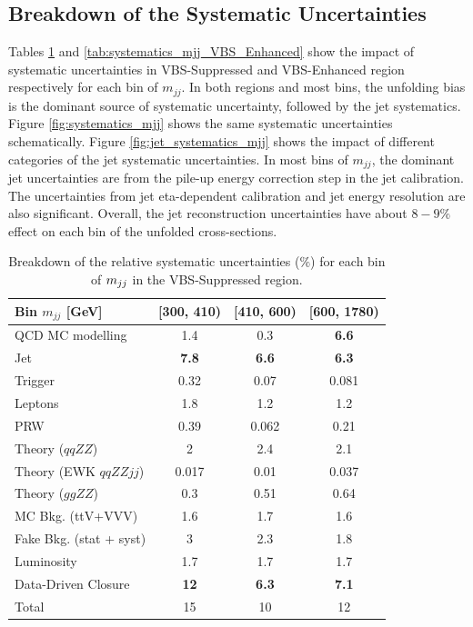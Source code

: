 \subsection{Breakdown of the Systematic Uncertainties }
\label{subsec:SysUncBreakdown}
Tables \ref{tab:systematics_mjj_VBS_Suppressed} and \ref{tab:systematics_mjj_VBS_Enhanced} show the impact of systematic uncertainties in VBS-Suppressed and VBS-Enhanced region respectively for each bin of $m_{jj}$. In both regions and most bins, the unfolding bias is the dominant source of systematic uncertainty, followed by the jet systematics. Figure \ref{fig:systematics_mjj} shows the same systematic uncertainties schematically. Figure \ref{fig:jet_systematics_mjj} shows the impact of different categories of the jet systematic uncertainties. In most bins of $m_{jj}$, the dominant jet uncertainties are from the pile-up energy correction step in the jet calibration. The uncertainties from jet eta-dependent calibration and jet energy resolution are also significant. Overall, the jet reconstruction uncertainties have about $8-9\%$ effect on each bin of the unfolded cross-sections.

\begin{table}
\centering
\begin{tabular}{|l || c | c | c | }
\hline 
Bin $m_{jj}$ [GeV] & [300, 410) & [410, 600) & [600, 1780)\\
\hline 
QCD MC modelling & 1.4 & 0.3 & \textbf{6.6 }\\
Jet & \textbf{7.8} & \textbf{6.6} & \textbf{6.3 }\\
Trigger & 0.32 & 0.07 & 0.081 \\
Leptons & 1.8 & 1.2 & 1.2 \\
PRW & 0.39 & 0.062 & 0.21\\
Theory ($qqZZ$) & 2 & 2.4 & 2.1 \\
Theory (EWK $qqZZjj$) & 0.017 & 0.01 & 0.037 \\
Theory ($ggZZ$) & 0.3 & 0.51 & 0.64 \\
MC Bkg. (ttV+VVV) & 1.6 & 1.7 & 1.6 \\
Fake Bkg. (stat + syst) & 3 & 2.3 & 1.8 \\
Luminosity & 1.7 & 1.7 & 1.7 \\
Data-Driven Closure & \textbf{12} & \textbf{6.3} & \textbf{7.1}\\
\hline
Total & 15 & 10 & 12 \\
\hline
\end{tabular}
\caption{Breakdown of the relative systematic uncertainties ($\%$) for each bin of $m_{jj}$ in the VBS-Suppressed region. \label{tab:systematics_mjj_VBS_Suppressed}}
\end{table}

